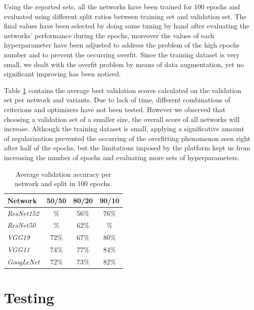 \documentclass[10pt,twocolumn,letterpaper]{article}
\begin{document}
Using the reported sets, all the networks have been trained for 100 epochs and evaluated using different split ratios between training set and validation set. The final values have been selected by doing some tuning by hand after evaluating the networks' performance during the epochs, moreover the values of each hyperparameter have been adjusted to address the problem of the high epochs number and to prevent the occurring overfit. Since the training dataset is very small, we dealt with the overfit problem by means of data augmentation, yet no significant improving has been noticed.

Table \ref{tab:val} contains the average best validation scores calculated on the validation set per network and variants. Due to lack of time, different combinations of criterions and optimizers have not been tested. However we observed that choosing a validation set of a smaller size, the overall score of all networks will increase. Although the training dataset is small, applying a significative amount of regularization prevented the occurring of the overfitting phenomenon seen right after half of the epochs, but the limitations imposed by the platform kept us from increasing the number of epochs and evaluating more sets of hyperparameters.

\begin{table}[ht]
   \begin{center}
   \def\arraystretch{1.5}
   \begin{tabular}{l|c|c|c}
      \textbf{Network} & \textbf{50/50} & \textbf{80/20} & \textbf{90/10} \\
   \hline
   \textit{ResNet152} & \% & 56\% & 76\% \\
   \hline
   \textit{ResNet50} & \% & 62\% & \% \\
   \hline
   \textit{VGG19} & 72\% & 67\% & 80\% \\
   \hline
   \textit{VGG11} & 74\% & 77\% & 84\% \\
   \hline
   \textit{GoogLeNet} & 72\% & 73\% & 82\% \\
   \end{tabular}
   \end{center}
   \caption{Average validation accuracy per network and split in 100 epochs.}
   \label{tab:val}
   \end{table}

\section{Testing}\label{testing}
\end{document}
